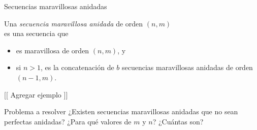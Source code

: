 \documentclass[spanish,xcolor={table}]{beamer}
\begin{document}

\begin{frame}{Secuencias maravillosas anidadas}

\begin{definition}
  Una \emph{secuencia maravillosa anidada} de orden $(n,m)$ \\
  es una secuencia que
  \begin{itemize}
    \item es maravillosa de orden $(n,m)$, y
    \item si $n > 1$, es la concatenación de $b$ secuencias maravillosas anidadas
    de orden $(n-1, m)$.
  \end{itemize}
\end{definition}

\begin{examples}
  {[[ Agregar ejemplo ]]}
\end{examples}

\begin{alertblock}{Problema a resolver}
  ¿Existen secuencias maravillosas anidadas que no sean perfectas anidadas? 
  ¿Para qué valores de $m$ y $n$? ¿Cuántas son?
\end{alertblock}

\end{frame}

\end{document}
